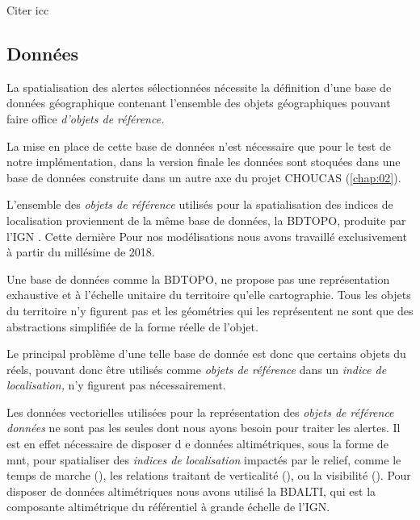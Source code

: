 Citer icc



\subsection{Données}

La spatialisation des alertes sélectionnées nécessite la définition
d'une base de données géographique contenant l'ensemble des objets
géographiques pouvant faire office \emph{d'objets de référence.}

La mise en place de cette base de données n'est nécessaire que pour le
test de notre implémentation, dans la version finale les données sont
stoquées dans une base de données construite dans un autre axe du
projet CHOUCAS (\autoref{chap:02}).
 

L'ensemble des \emph{objets de référence} utilisés pour la
spatialisation des indices de localisation proviennent de la même base
de données, la BDTOPO, produite par l'IGN \autocite{IGN2020}. Cette
dernière
%
Pour nos modélisations nous avons travaillé exclusivement à partir du
millésime de 2018.


Une base de données comme la BDTOPO, ne propose pas une représentation
exhaustive et à l'échelle unitaire du territoire qu'elle
cartographie. Tous les objets du territoire n'y figurent pas et les
géométries qui les représentent ne sont que des abstractions
simplifiée de la forme réelle de l'objet.

Le principal problème d'une telle base de donnée est donc que certains
objets du réels, pouvant donc être utilisés comme \emph{objets de
  référence} dans un \emph{indice de localisation,} n'y figurent pas
nécessairement.

Les données vectorielles utilisées pour la représentation des
\emph{objets de référence données} ne sont pas les seules dont nous
ayons besoin pour traiter les alertes. Il est en effet nécessaire de
disposer d e données altimétriques, sous la forme de \ac{mnt}, pour
spatialiser des \emph{indices de localisation} impactés par le relief,
comme le temps de marche (), les
relations traitant de verticalité (\eg {}), ou
la visibilité (). Pour disposer de
données altimétriques nous avons utilisé la BDALTI, qui est la
composante altimétrique du référentiel à grande échelle de l'IGN.


